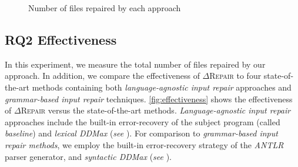 \documentclass[acmsmall,screen,review,anonymous]{acmart}
\newcommand{\approach}{\textsc{$\Delta$Repair}\xspace}
\newcommand{\ddmax}{\textit{DDMax}\xspace}
\begin{document}
\begin{figure}[!tbp]\centering
\centering
{}\effectivenessdata
\begin{minipage}{.45\textwidth}
\end{minipage}
\caption{Number of files repaired by each approach}
\label{fig:effectiveness}
\end{figure}

\subsection{RQ2 Effectiveness} 
In this experiment,
we measure the total number of files repaired by our approach. In addition, we compare 
the 
effectiveness of \approach to 
four state-of-the-art methods containing 
both \textit{language-agnostic input repair} approaches and \textit{grammar-based input repair} techniques. 
\autoref{fig:effectiveness} shows the effectiveness of \approach versus the state-of-the-art methods. 
\textit{Language-agnostic input repair} approaches include the built-in error-recovery of the subject program (called \textit{baseline}) and 
\textit{lexical \ddmax} (\textit{see}  ). 
For comparison to \textit{grammar-based input repair methods}, we employ the built-in error-recovery strategy of the \textit{ANTLR} parser generator, and \textit{syntactic \ddmax}  (\textit{see}  ). 
 
\end{document}
